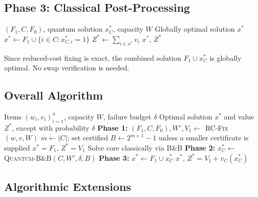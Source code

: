 \documentclass[pdflatex,sn-mathphys-num]{sn-jnl}
\begin{document}
\subsection{Phase 3: Classical Post-Processing}

\begin{algorithm}[h]
\caption{Classical Reconstruction}
\label{alg:postprocess}
\begin{algorithmic}[1]
\REQUIRE $(F_1, C, F_0)$, quantum solution $x^*_C$, capacity $W$
\ENSURE Globally optimal solution $x^*$
\STATE $x^* \leftarrow F_1 \cup \{i \in C : x^*_{C,i} = 1\}$
\STATE $Z^* \leftarrow \sum_{i \in x^*} v_i$
\RETURN $x^*$, $Z^*$
\end{algorithmic}
\end{algorithm}

Since reduced-cost fixing is exact, the combined solution $F_1 \cup x^*_C$ is globally optimal. No swap verification is needed.

\subsection{Overall Algorithm}

\begin{algorithm}[h]
\caption{LP-Pruned Quantum B\&B Knapsack Solver}
\label{alg:hybrid}
\begin{algorithmic}[1]
\REQUIRE Items $(w_i, v_i)_{i=1}^n$, capacity $W$, failure budget $\delta$
\ENSURE Optimal solution $x^*$ and value $Z^*$, except with probability $\delta$
\STATE \textbf{Phase 1:} $(F_1, C, F_0), W', V_1 \leftarrow$ \textsc{RC-Fix}$(w, v, W)$ 
\STATE $m \leftarrow |C|$; set certified $B\leftarrow 2^{m+1}-1$ unless a smaller certificate is supplied
    \RETURN $x^* = F_1$, $Z^* = V_1$
    \STATE Solve core classically via B\&B
\ELSE
    \STATE \textbf{Phase 2:} $x^*_C \leftarrow$ \textsc{Quantum-B\&B}$(C,W',\delta,B)$ 
\ENDIF
\STATE \textbf{Phase 3:} $x^* \leftarrow F_1 \cup x^*_C$
\RETURN $x^*$, $Z^* = V_1 + v_C(x^*_C)$
\end{algorithmic}
\end{algorithm}

\subsection{Algorithmic Extensions}
\end{document}
